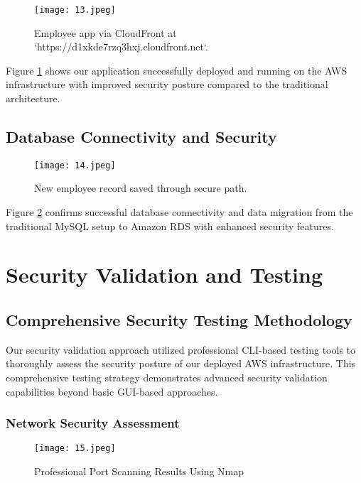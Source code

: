 \documentclass[12pt]{article}
\begin{document}
\begin{figure}[H]
\centering
\texttt{[image: 13.jpeg]}
\caption{Employee app via CloudFront at `https://d1xkde7rzq3hxj.cloudfront.net`.}
\label{fig:app_running}
\end{figure}

Figure \ref{fig:app_running} shows our application successfully deployed and running on the AWS infrastructure with improved security posture compared to the traditional architecture.

\subsection{Database Connectivity and Security}

\begin{figure}[H]
\centering
\texttt{[image: 14.jpeg]}
\caption{New employee record saved through secure path.}
\label{fig:db_connectivity}
\end{figure}

Figure \ref{fig:db_connectivity} confirms successful database connectivity and data migration from the traditional MySQL setup to Amazon RDS with enhanced security features.

\section{Security Validation and Testing}

\subsection{Comprehensive Security Testing Methodology}

Our security validation approach utilized professional CLI-based testing tools to thoroughly assess the security posture of our deployed AWS infrastructure. This comprehensive testing strategy demonstrates advanced security validation capabilities beyond basic GUI-based approaches.

\subsubsection{Network Security Assessment}

\begin{figure}[H]
\centering
\texttt{[image: 15.jpeg]}
\caption{Professional Port Scanning Results Using Nmap}
\label{fig:port_scanning}
\end{figure}
\end{document}
